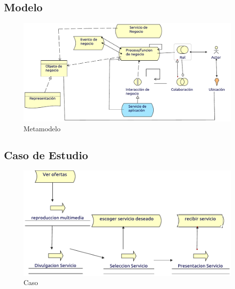 \subsection{Modelo}
\begin{figure}[h!]
	\centering
	\includegraphics[width=\linewidth]{Arquitectura/Negocio/imgs/ProcesoNegocioMetamodelo.pdf}
	\caption{Metamodelo}
\end{figure}
\newpage
\subsection{Caso de Estudio}

\begin{figure}[h!]
	\centering
	\includegraphics[width=\linewidth]{Arquitectura/Negocio/imgs/ProcesoNegocio.pdf}
	\caption{Caso}
\end{figure}
\newpage

